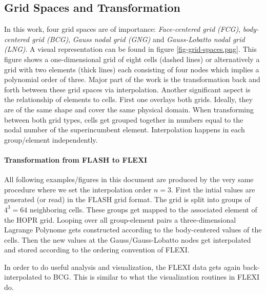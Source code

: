 \subsection{Grid Spaces and Transformation}

In this work, four grid spaces are of importance: \emph{Face-centered grid
(FCG)}, \emph{body-centered grid (BCG)}, \emph{Gauss nodal grid (GNG)} and
\emph{Gauss-Lobatto nodal grid (LNG)}. A visual representation can be found in
figure \ref{fig-grid-spaces.png}. This figure shows a one-dimensional grid of
eight cells (dashed lines) or alternatively a grid with two elements (thick
lines) each consisting of four nodes which implies a polynomial order of three.
Major part of the work is the transformation back and forth between these
grid spaces via interpolation. Another significant aspect is the relationship
of elements to cells. First one overlays both grids. Ideally, they are of the
same shape and cover the same physical domain. When transforming between both
grid types, cells get grouped together in numbers equal to the nodal number of
the superincumbent element. Interpolation happens in each group/element
independently.


\paragraph{Transformation from \textsc{FLASH} to \textsc{FLEXI}}

All following examples/figures in this document are produced by the very same
procedure where we set the interpolation order $n = 3$. First the intial values
are generated (or read) in the FLASH grid format. The grid is split into groups
of $4^3 = 64$ neighboring cells. These groups get mapped to the associated
element of the HOPR grid. Looping over all group-element pairs a
three-dimensional Lagrange Polynome gets constructed according to the
body-centered values of the cells. Then the new values at the
Gauss/Gauss-Lobatto nodes get interpolated and stored according to the ordering
convention of FLEXI.

In order to do useful analysis and visualization, the FLEXI data gets again
back-interpolated to BCG. This is similar to what the visualization routines in
FLEXI do.

